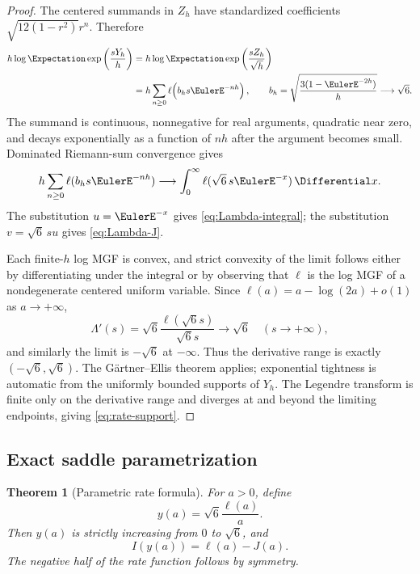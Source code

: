\documentclass[11pt]{article}
\numberwithin{equation}{section}
\newtheorem{theorem}{Theorem}[section]
\theoremstyle{definition}
\begin{document}
\begin{proof}
The centered summands in \(Z_h\) have standardized coefficients \(\sqrt{12(1-r^2)}r^n\).  Therefore
\begin{align*}
 h\log\Expectation\exp\left(\frac{sY_h}{h}\right)
 &=h\log\Expectation\exp\left(\frac{sZ_h}{\sqrt h}\right)\\
 &=h\sum_{n\ge0}\ell\!\left(b_hs\EulerE^{-nh}\right),
 \qquad
 b_h=\sqrt{\frac{3(1-\EulerE^{-2h})}{h}}\longrightarrow\sqrt6.
\end{align*}
The summand is continuous, nonnegative for real arguments, quadratic near zero, and decays exponentially as a function of \(nh\) after the argument becomes small.  Dominated Riemann-sum convergence gives
\[
 h\sum_{n\ge0}\ell(b_hs\EulerE^{-nh})
 \longrightarrow\int_0^\infty\ell(\sqrt6\,s\EulerE^{-x})\,\Differential x.
\]
The substitution \(u=\EulerE^{-x}\) gives \eqref{eq:Lambda-integral}; the substitution \(v=\sqrt6\,su\) gives \eqref{eq:Lambda-J}.

Each finite-\(h\) log MGF is convex, and strict convexity of the limit follows either by differentiating under the integral or by observing that \(\ell\) is the log MGF of a nondegenerate centered uniform variable.  Since \(\ell(a)=a-\log(2a)+o(1)\) as \(a\to+\infty\),
\[
 \Lambda'(s)=\sqrt6\frac{\ell(\sqrt6s)}{\sqrt6s}\to\sqrt6
 \quad(s\to+\infty),
\]
and similarly the limit is \(-\sqrt6\) at \(-\infty\).  Thus the derivative range is exactly \((-\sqrt6,\sqrt6)\).  The G\"artner--Ellis theorem \cite{DemboZeitouni} applies; exponential tightness is automatic from the uniformly bounded supports of \(Y_h\).  The Legendre transform is finite only on the derivative range and diverges at and beyond the limiting endpoints, giving \eqref{eq:rate-support}.
\end{proof}

\subsection{Exact saddle parametrization}
\begin{theorem}[Parametric rate formula]\label{thm:rate-parametric}
For \(a>0\), define
\begin{equation}\label{eq:y-a}
 y(a)=\sqrt6\frac{\ell(a)}{a}.
\end{equation}
Then \(y(a)\) is strictly increasing from \(0\) to \(\sqrt6\), and
\begin{equation}\label{eq:I-parametric}
 \boxed{
 I(y(a))=\ell(a)-J(a).}
\end{equation}
The negative half of the rate function follows by symmetry.
\end{theorem}
\end{document}
